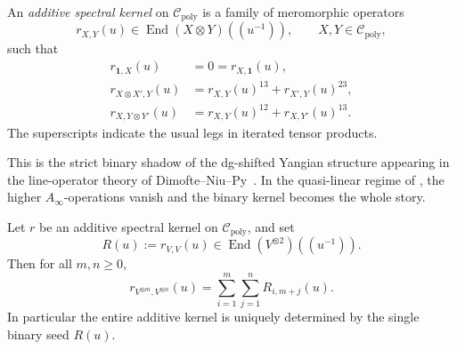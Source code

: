 \begin{definition}
\label{def:additive-spectral-kernel}
An \emph{additive spectral kernel} on $\mathcal C_{\mathrm{poly}}$ is a
family of meromorphic operators
\begin{equation}
r_{X,Y}(u)\in \operatorname{End}(X\otimes Y)((u^{-1})),
\qquad X,Y\in \mathcal C_{\mathrm{poly}},
\end{equation}
such that
\begin{align}
r_{\mathbf 1,X}(u)&=0=r_{X,\mathbf 1}(u),
\label{eq:additive-kernel-unit}\\
r_{X\otimes X',Y}(u)&=r_{X,Y}(u)^{13}+r_{X',Y}(u)^{23},
\label{eq:additive-kernel-left}\\
r_{X,Y\otimes Y'}(u)&=r_{X,Y}(u)^{12}+r_{X,Y'}(u)^{13}.
\label{eq:additive-kernel-right}
\end{align}
The superscripts indicate the usual legs in iterated tensor products.
\end{definition}

This is the strict binary shadow of the dg-shifted Yangian structure
appearing in the line-operator theory of
Dimofte--Niu--Py~\cite{DNP25}. In the quasi-linear regime of
\cite{DNP25}, the higher $A_\infty$-operations vanish and the binary
kernel becomes the whole story.

\begin{theorem}
\ClaimStatusProvedHere
\label{thm:vector-seed-propagation}
Let $r$ be an additive spectral kernel on
$\mathcal C_{\mathrm{poly}}$, and set
\begin{equation}
R(u):=r_{V,V}(u)\in \operatorname{End}(V^{\otimes 2})((u^{-1})).
\end{equation}
Then for all $m,n\ge 0$,
\begin{equation}
\label{eq:vector-seed-propagation}
r_{V^{\otimes m},V^{\otimes n}}(u)
=
\sum_{i=1}^m\sum_{j=1}^n R_{i,m+j}(u).
\end{equation}
In particular the entire additive kernel is uniquely determined by the
single binary seed $R(u)$.
\end{theorem}

